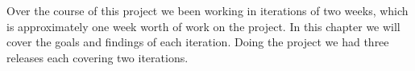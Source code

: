 Over the course of this project we been working in iterations of two weeks, which is approximately one week worth of work on the project. In this chapter we will cover the goals and findings of each iteration. Doing the project we had three releases each covering two iterations.


